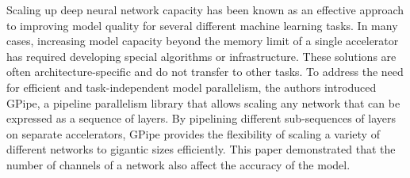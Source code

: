 Scaling up deep neural network capacity has been known as an effective approach to improving model quality for several different machine learning tasks. In many cases, increasing model capacity beyond the memory limit of a single accelerator has required developing special algorithms or infrastructure. These solutions are often architecture-specific and do not transfer to other tasks. To address the need for efficient and task-independent model parallelism, the authors introduced GPipe, a pipeline parallelism library that allows scaling any network that can be expressed as a sequence of layers. By pipelining different sub-sequences of layers on separate accelerators, GPipe provides the flexibility of scaling a variety of different networks to gigantic sizes efficiently. This paper demonstrated that the number of channels of a network also affect the accuracy of the model.
